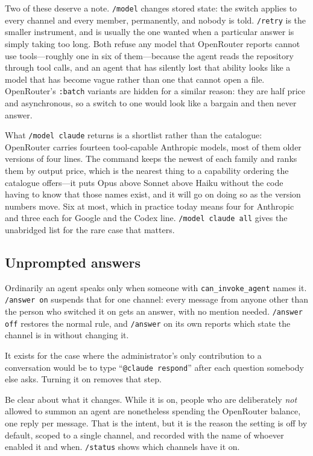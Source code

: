 \documentclass[11pt,letterpaper]{article}
\begin{document}
Two of these deserve a note. \texttt{/model} changes stored state: the switch
applies to every channel and every member, permanently, and nobody is told.
\texttt{/retry} is the smaller instrument, and is usually the one wanted when
a particular answer is simply taking too long. Both refuse any model that
OpenRouter reports cannot use tools---roughly one in six of them---because the
agent reads the repository through tool calls, and an agent that has silently
lost that ability looks like a model that has become vague rather than one
that cannot open a file. OpenRouter's \texttt{:batch} variants are hidden for
a similar reason: they are half price and asynchronous, so a switch to one
would look like a bargain and then never answer.

What \texttt{/model claude} returns is a shortlist rather than the catalogue:
OpenRouter carries fourteen tool-capable Anthropic models, most of them older
versions of four lines. The command keeps the newest of each family and ranks
them by output price, which is the nearest thing to a capability ordering the
catalogue offers---it puts Opus above Sonnet above Haiku without the code
having to know that those names exist, and it will go on doing so as the
version numbers move. Six at most, which in practice today means four for
Anthropic and three each for Google and the Codex line. \texttt{/model claude
all} gives the unabridged list for the rare case that matters.

\subsection{Unprompted answers}
\label{sec:answer}

Ordinarily an agent speaks only when someone with \texttt{can\_invoke\_agent}
names it. \texttt{/answer on} suspends that for one channel: every message
from anyone other than the person who switched it on gets an answer, with no
mention needed. \texttt{/answer off} restores the normal rule, and
\texttt{/answer} on its own reports which state the channel is in without
changing it.

It exists for the case where the administrator's only contribution to a
conversation would be to type ``\texttt{@claude respond}'' after each question
somebody else asks. Turning it on removes that step.

Be clear about what it changes. While it is on, people who are deliberately
\emph{not} allowed to summon an agent are nonetheless spending the OpenRouter
balance, one reply per message. That is the intent, but it is the reason the
setting is off by default, scoped to a single channel, and recorded with the
name of whoever enabled it and when. \texttt{/status} shows which channels
have it on.
\end{document}
